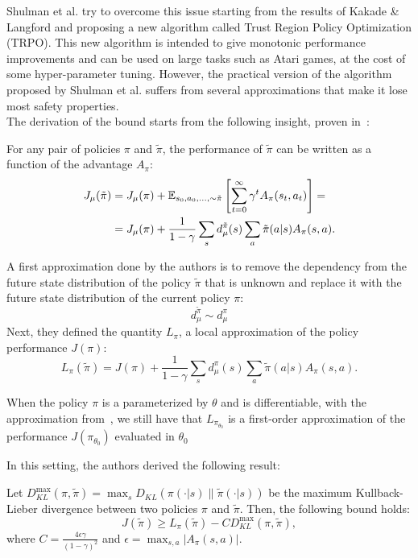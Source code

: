 Shulman et al. try to overcome this issue starting from the results of Kakade \& Langford and proposing a new algorithm called Trust Region Policy Optimization (TRPO). This new algorithm is intended to give monotonic performance improvements and can be used on large tasks such as Atari games, at the cost of some hyper-parameter tuning. However, the practical version of the algorithm proposed by Shulman et al. suffers from several approximations that make it lose most safety properties.\\
The derivation of the bound starts from the following insight, proven in~\cite{natural}:
\begin{lemma}
For any pair of policies $\pi$ and $\tilde{\pi}$, the performance of $\tilde{\pi}$ can be written as a function of the advantage $A_\pi$:
\begin{align*}
J_\mu(\tilde{\pi}) &= J_\mu(\pi) + \EV[s_0, a_0, \ldots,\sim\tilde{\pi}]{\sum_{t=0}^{\infty}\gamma^t A_\pi(s_t,a_t)} =\\&= J_\mu(\pi) + \frac{1}{1-\gamma}\sum_s d_{\mu}^{\tilde{\pi}}(s)\sum_a \tilde{\pi}(a|s)A_\pi(s,a).
\end{align*}
\end{lemma}

A first approximation done by the authors is to remove the dependency from the future state distribution of the policy $\tilde{\pi}$ that is unknown and replace it with the future state distribution of the current policy $\pi$:
\begin{equation}
\label{eq:trpo-first-approx}
d_\mu^{\tilde{\pi}}\sim d_\mu^{\pi}
\end{equation}
Next, they defined the quantity $L_\pi$, a local approximation of the policy performance $J(\pi)$:
\[
L_\pi(\tilde{\pi}) = J(\pi) + \frac{1}{1-\gamma}\sum_s d_\mu^{\pi}(s) \sum_a \tilde{\pi}(a|s) A_\pi(s,a).
\]
\begin{note}
When the policy $\pi$ is a parameterized by $\theta$ and is differentiable, with the approximation from~, we still have that $L_{\pi_{\theta_0}}$ is a first-order approximation of the performance $J(\pi_{\theta_0})$ evaluated in $\theta_0$
\end{note}

In this setting, the authors derived the following result:
\begin{theorem}
\label{th:trpo-main}
Let $D_{KL}^{\max}(\pi, \tilde{\pi}) = \max_s D_{KL}(\pi(\cdot|s) \parallel \tilde{\pi}(\cdot|s))$ be the maximum Kullback-Lieber divergence between two policies $\pi$ and $\tilde{\pi}$. Then, the following bound holds:
\[
J(\tilde{\pi})\geq L_\pi(\tilde{\pi})-CD_{KL}^{\max}(\pi, \tilde{\pi}),
\]
where $C = \frac{4\epsilon\gamma}{(1-\gamma)^2}$ and $\epsilon = \max_{s,a}|A_\pi (s,a)|$.
\end{theorem}


